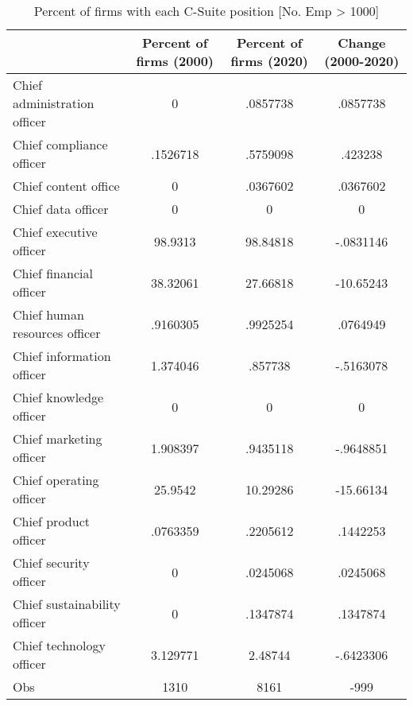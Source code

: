\begin{table}[htbp]\centering
\caption{Percent of firms with each C-Suite position [No. Emp > 1000]\label{tab98}}
\begin{tabular}{l*{3}{c}}
\toprule
                    &Percent of firms (2000)&Percent of firms (2020)&Change (2000-2020)\\
\midrule
Chief administration officer&           0&    .0857738&    .0857738\\
Chief compliance officer&    .1526718&    .5759098&     .423238\\
Chief content office&           0&    .0367602&    .0367602\\
Chief data officer  &           0&           0&           0\\
Chief executive officer&     98.9313&    98.84818&   -.0831146\\
Chief financial officer&    38.32061&    27.66818&   -10.65243\\
Chief human resources officer&    .9160305&    .9925254&    .0764949\\
Chief information officer&    1.374046&     .857738&   -.5163078\\
Chief knowledge officer&           0&           0&           0\\
Chief marketing officer&    1.908397&    .9435118&   -.9648851\\
Chief operating officer&     25.9542&    10.29286&   -15.66134\\
Chief product officer&    .0763359&    .2205612&    .1442253\\
Chief security officer&           0&    .0245068&    .0245068\\
Chief sustainability officer&           0&    .1347874&    .1347874\\
Chief technology officer&    3.129771&     2.48744&   -.6423306\\
Obs                 &        1310&        8161&        -999\\
\bottomrule
\end{tabular}
\end{table}
